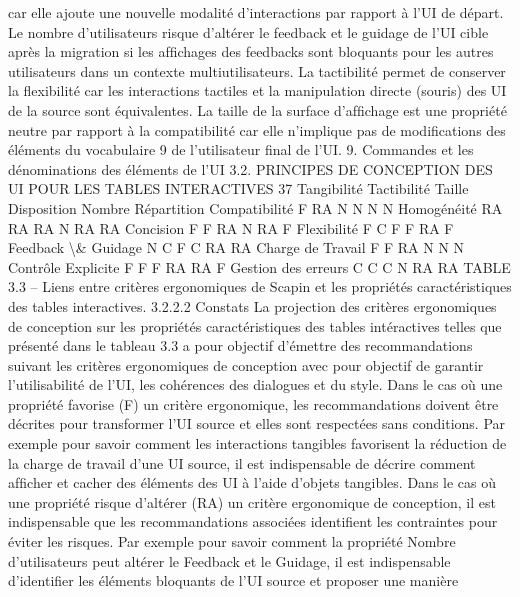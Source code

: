 \documentclass{article}
\begin{document}
car elle ajoute une nouvelle modalit\'{e} d’interactions par rapport \`{a} l’UI de d\'{e}part.
Le nombre d’utilisateurs risque d’alt\'{e}rer le feedback et le guidage de l’UI cible apr\`{e}s la migration
si les afﬁchages des feedbacks sont bloquants pour les autres utilisateurs dans un contexte multiutilisateurs.
La tactibilit\'{e} permet de conserver la ﬂexibilit\'{e} car les interactions tactiles et la manipulation directe (souris) des UI de la source sont \'{e}quivalentes.
La taille de la surface d’afﬁchage est une propri\'{e}t\'{e} neutre par rapport \`{a} la compatibilit\'{e} car elle
n’implique pas de modiﬁcations des \'{e}l\'{e}ments du vocabulaire 9 de l’utilisateur ﬁnal de l’UI.
9. Commandes et les d\'{e}nominations des \'{e}l\'{e}ments de l’UI
3.2. PRINCIPES DE CONCEPTION DES UI POUR LES TABLES INTERACTIVES
37
Tangibilit\'{e}
Tactibilit\'{e}
Taille
Disposition
Nombre
R\'{e}partition
Compatibilit\'{e}
F
RA
N
N
N
N
Homog\'{e}n\'{e}it\'{e}
RA
RA
RA
N
RA
RA
Concision
F
F
RA
N
RA
F
Flexibilit\'{e}
F
C
F
F
RA
F
Feedback
\textbackslash{}&
Guidage
N
C
F
C
RA
RA
Charge de Travail
F
F
RA
N
N
N
Contr\^{o}le Explicite
F
F
F
RA
RA
F
Gestion des erreurs
C
C
C
N
RA
RA
TABLE 3.3 – Liens entre crit\`{e}res ergonomiques de Scapin et les propri\'{e}t\'{e}s caract\'{e}ristiques des tables
interactives.
3.2.2.2
Constats
La projection des crit\`{e}res ergonomiques de conception sur les propri\'{e}t\'{e}s caract\'{e}ristiques des tables
int\'{e}ractives telles que pr\'{e}sent\'{e} dans le tableau 3.3 a pour objectif d’\'{e}mettre des recommandations
suivant les crit\`{e}res ergonomiques de conception avec pour objectif de garantir l’utilisabilit\'{e} de l’UI,
les coh\'{e}rences des dialogues et du style.
Dans le cas o\`{u} une propri\'{e}t\'{e} favorise (F) un crit\`{e}re ergonomique, les recommandations doivent
\^{e}tre d\'{e}crites pour transformer l’UI source et elles sont respect\'{e}es sans conditions. Par exemple pour
savoir comment les interactions tangibles favorisent la r\'{e}duction de la charge de travail d’une UI
source, il est indispensable de d\'{e}crire comment afﬁcher et cacher des \'{e}l\'{e}ments des UI \`{a} l’aide d’objets
tangibles.
Dans le cas o\`{u} une propri\'{e}t\'{e} risque d’alt\'{e}rer (RA) un crit\`{e}re ergonomique de conception, il est
indispensable que les recommandations associ\'{e}es identiﬁent les contraintes pour \'{e}viter les risques. Par
exemple pour savoir comment la propri\'{e}t\'{e} Nombre d’utilisateurs peut alt\'{e}rer le Feedback et le Guidage, il est indispensable d’identiﬁer les \'{e}l\'{e}ments bloquants de l’UI source et proposer une mani\`{e}re
\end{document}
